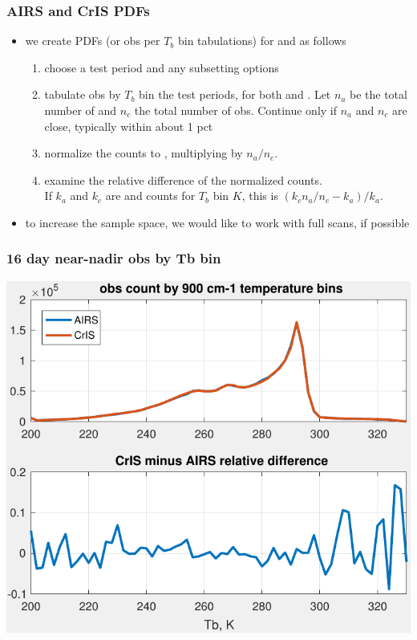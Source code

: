 \documentclass[11pt]{beamer}
\begin{document}
\begin{frame}
\frametitle{AIRS and CrIS PDFs}
\begin{itemize}

  \item we create PDFs (or obs per $T_b$ bin tabulations) for
    {\airs} and {\cris} as follows

\begin{enumerate}
  \item choose a test period and any subsetting options

  \item tabulate obs by $T_b$ bin the test periods, for both {\airs}
    and {\cris}.  Let $n_a$ be the total number of {\airs} and $n_c$
    the total number of {\cris} obs.  Continue only if $n_a$ and
    $n_c$ are close, typically within about 1 pct

  \item normalize the {\cris} counts to {\airs}, multiplying by
    $n_a/n_c$.

  \item examine the relative difference of the normalized counts.  \\
    If $k_a$ and $k_c$ are {\airs} and {\cris} counts for $T_b$ bin
    $K$, this is $( k_c n_a/n_c - k_a) / k_a$.
\end{enumerate}

  \item to increase the sample space, we would like to work with
    full scans, if possible

\end{itemize}
\end{frame}
\begin{frame}
\frametitle{16 day near-nadir obs by Tb bin}
\begin{center}
  \includegraphics[scale=0.7]{figures/plot_tbin_test_11.pdf}
\end{center}
\end{frame} %
\end{document}
